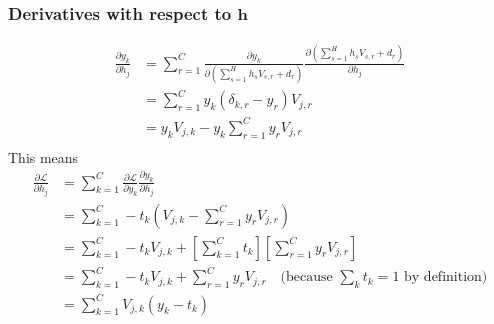 \documentclass{article}
\begin{document}
\subsubsection*{Derivatives with respect to $\mathbf{h}$}
\begin{equation}
\begin{split}
    \frac{\partial y_k}{\partial h_j}
    &= \sum_{r=1}^C \frac{\partial y_k}{\partial (\sum_{s=1}^H h_s V_{s,r} + d_r)}
        \frac{\partial(\sum_{s=1}^H h_s V_{s,r} + d_r)}{\partial h_j} \\
    &= \sum_{r=1}^C y_k(\delta_{k,r} - y_r) V_{j,r} \\
    &= y_k V_{j,k} - y_k \sum_{r=1}^C y_r V_{j,r} \\
\end{split}
\end{equation}
This means
\begin{equation}
\begin{split}
    \frac{\partial \mathcal{L}}{\partial h_j}
    &= \sum_{k=1}^C \frac{\partial \mathcal{L}}{\partial y_k}
                    \frac{\partial y_k}{\partial h_j} \\
    &= \sum_{k=1}^C -t_k \left(V_{j,k} - \sum_{r=1}^C y_r V_{j,r} \right) \\
    &= \sum_{k=1}^C -t_k V_{j,k} +
       \left[\sum_{k=1}^C t_k \right]\left[\sum_{r=1}^C y_r V_{j,r} \right] \\
    &= \sum_{k=1}^C -t_k V_{j,k} +
       \sum_{r=1}^C y_r V_{j,r} \quad \textrm{(because $\sum_k t_k
       = 1$ by definition)}\\
    &= \sum_{k=1}^C V_{j,k}(y_k - t_k) \\
\end{split}
\end{equation}
\end{document}
